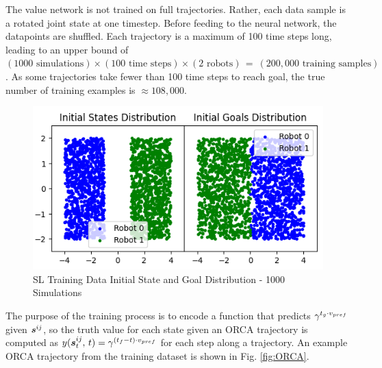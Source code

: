 \documentclass[conference]{IEEEtran}
\begin{document}
The value network is not trained on full trajectories. Rather, each data sample is a rotated joint state at one timestep. Before feeding to the neural network, the datapoints are shuffled. Each trajectory is a maximum of 100 time steps long, leading to an upper bound of $(1000 \text{ simulations})\times(100\text{ time steps})\times(2 \text{ robots}) \, = \ (200,000 \text{ training samples})$. As some trajectories take fewer than 100 time steps to reach goal, the true number of training examples is $\approx108,000$.

\begin{figure}[h!]
    \centering
    \includegraphics[width=0.9\linewidth]{docs/latex/figures/training_data_distribution.png}
    \caption{SL Training Data Initial State and Goal Distribution - 1000 Simulations}
    \label{fig:training_init}
\end{figure}


The purpose of the training process is to encode a function that predicts $\gamma{}^{t_g\cdot v_{pref}}$ given $\boldsymbol{s}^{ij}_{}$, so the truth value for each state given an ORCA trajectory is computed as $y(\boldsymbol{s}^{ij}_{t}, \, t)=\gamma{}^{(t_{f}-t)\cdot v_{pref}}$ for each step along a trajectory. An example ORCA trajectory from the training dataset is shown in Fig. \ref{fig:ORCA}.
\end{document}
